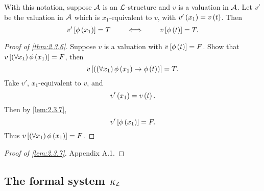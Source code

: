 \begin{lemma}
\label{lem:2.3.7}
With this notation, suppose $ \AA $ is an $ \LL $-structure and $ v $ is a valuation in $ \AA $. Let $ v' $ be the valuation in $ \AA $ which is $ x_1 $-equivalent to $ v $, with $ v'\rb{x_1} = v\rb{t} $. Then
$$ v'\sb{\phi\rb{x_1}} = T \qquad \iff \qquad v\sb{\phi\rb{t}} = T. $$
\end{lemma}

\begin{proof}[Proof of \ref{thm:2.3.6}]
Suppose $ v $ is a valuation with $ v\sb{\phi\rb{t}} = F $. Show that $ v\sb{\fab{x_1}\phi\rb{x_1}} = F $, then
$$ v\sb{\impb{\fab{x_1}\phi\rb{x_1}}{\phi\rb{t}}} = T. $$
Take $ v' $, $ x_1 $-equivalent to $ v $, and
$$ v'\rb{x_1} = v\rb{t}. $$
Then by \ref{lem:2.3.7},
$$ v'\sb{\phi\rb{x_1}} = F. $$
Thus $ v\sb{\fab{x_1}\phi\rb{x_1}} = F $.
\end{proof}

\begin{proof}[Proof of \ref{lem:2.3.7}]
Appendix A.1.
\end{proof}

\subsection{The formal system $ K_\LL $}

